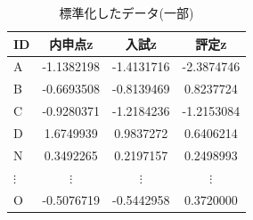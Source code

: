 \begin{table}[ht]
	\caption{標準化したデータ(一部)}
	\centering
	\begin{tabular}[t]{l|ccc}
		\hline
		ID       & 内申点z       & 入試z        & 評定z        \\
		\hline
		A        & -1.1382198 & -1.4131716 & -2.3874746 \\
		B        & -0.6693508 & -0.8139469 & 0.8237724  \\
		C        & -0.9280371 & -1.2184236 & -1.2153084 \\
		D        & 1.6749939  & 0.9837272  & 0.6406214  \\
		N        & 0.3492265  & 0.2197157  & 0.2498993  \\
		$\vdots$ & $\vdots$   & $\vdots$   & $\vdots$   \\
		O        & -0.5076719 & -0.5442958 & 0.3720000  \\
		\hline
	\end{tabular}
	\label{tbl::10_03}
\end{table}
